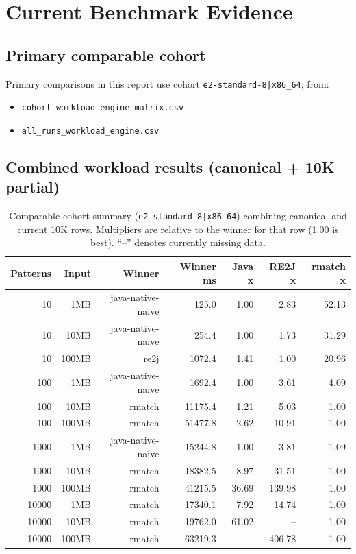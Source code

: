 \documentclass[11pt]{article}
\begin{document}
\section{Current Benchmark Evidence}
\subsection{Primary comparable cohort}
Primary comparisons in this report use cohort \texttt{e2-standard-8|x86\_64}, from:
\begin{itemize}
  \item \texttt{cohort\_workload\_engine\_matrix.csv}
  \item \texttt{all\_runs\_workload\_engine.csv}
\end{itemize}

\subsection{Combined workload results (canonical + 10K partial)}
\begin{table}[h!]
\centering
\small
\begin{tabular}{rrrrrrr}
\toprule
Patterns & Input & Winner & Winner ms & Java x & RE2J x & rmatch x \\
\midrule
10 & 1MB   & java-native-naive & 125.0   & 1.00 & 2.83  & 52.13 \\
10 & 10MB  & java-native-naive & 254.4   & 1.00 & 1.73  & 31.29 \\
10 & 100MB & re2j              & 1072.4  & 1.41 & 1.00  & 20.96 \\
100 & 1MB   & java-native-naive & 1692.4  & 1.00 & 3.61  & 4.09 \\
100 & 10MB  & rmatch            & 11175.4 & 1.21 & 5.03  & 1.00 \\
100 & 100MB & rmatch            & 51477.8 & 2.62 & 10.91 & 1.00 \\
1000 & 1MB   & java-native-naive & 15244.8 & 1.00 & 3.81  & 1.09 \\
1000 & 10MB  & rmatch            & 18382.5 & 8.97 & 31.51 & 1.00 \\
1000 & 100MB & rmatch            & 41215.5 & 36.69 & 139.98 & 1.00 \\
10000 & 1MB   & rmatch & 17340.1 & 7.92  & 14.74 & 1.00 \\
10000 & 10MB  & rmatch & 19762.0 & 61.02 & --    & 1.00 \\
10000 & 100MB & rmatch & 63219.3 & --    & 406.78 & 1.00 \\
\bottomrule
\end{tabular}
\caption{Comparable cohort summary (\texttt{e2-standard-8|x86\_64}) combining canonical and current 10K rows. Multipliers are relative to the winner for that row (1.00 is best). ``--'' denotes currently missing data.}
\end{table}
\end{document}
